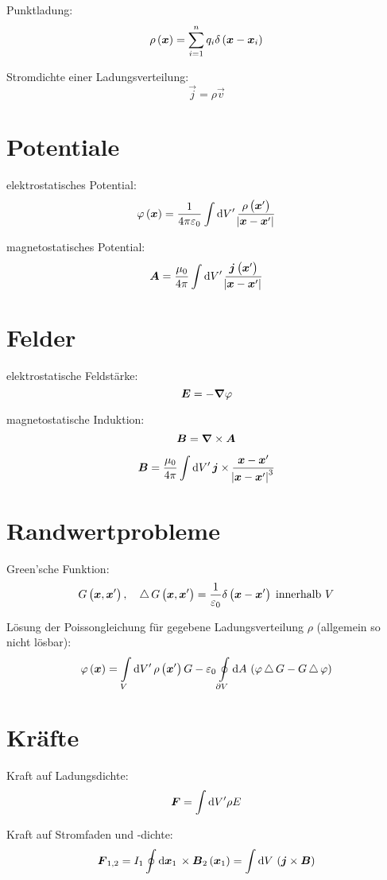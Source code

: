 Punktladung:
\[
	\rho\del{\vec x} = \sum_{i = 1}^n q_i \delta\del{\vec x - \vec x_i}
\]

Stromdichte einer Ladungsverteilung:
\[
	\vec j = \rho \vec v
\]

\section{Potentiale}

elektrostatisches Potential:
\[
	\varphi\del{\vec x}
	= \frac{1}{4 \pi \varepsilon_0} \int \dif{V'} \,
	\frac{\rho\del{\vec x'}}{\abs{\vec x - \vec x'}}
\]

magnetostatisches Potential:
\[
	\vec A
	= \frac{\mu_0}{4 \pi} \int \dif{V'} \,
	\frac{\vec j\del{\vec x'}}{\abs{\vec x - \vec x'}}
\]

\section{Felder}

elektrostatische Feldstärke:
\[
	\boldsymbol{E} = - \boldsymbol{\nabla} \varphi
\]

magnetostatische Induktion:
\[
	\boldsymbol{B} = \boldsymbol{\nabla} \times \boldsymbol{A}
\]

\[
	\vec B = \frac{\mu_0}{4 \pi} \int \dif{V'} \, \vec j \times \frac{\vec x - \vec x'}{\abs{\vec x - \vec x'}^3}
\]

\section{Randwertprobleme}

Green'sche Funktion:
\[
	G\del{\vec x, \vec x'}
	\eqnsep
	\laplace G\del{\vec x, \vec x'}
	= \frac{1}{\varepsilon_0} \delta\del{\vec x - \vec x'} \; \text{innerhalb $V$}
\]

Lösung der Poissongleichung für gegebene Ladungsverteilung $\rho$ (allgemein so
nicht lösbar):
\[
	\varphi\del{\vec x}
	= \intop_{V} \dif{V'} \, \rho\del{\vec x'} G
	- \varepsilon_0 \ointop_{\partial V} \dif A \,
	\del{\varphi \laplace G - G \laplace \varphi}
\]

\section{Kräfte}

Kraft auf Ladungsdichte:
\[
	\vec F
	= \int \dif{V'} \rho E
\]

Kraft auf Stromfaden und -dichte:
\[
	\vec F_{1,2}
	= I_1 \oint \dif{\vec x_1} \, \times \vec B_2\del{\vec x_1}
	= \int \dif{V} \, \del{\vec j \times \vec B}
\]

